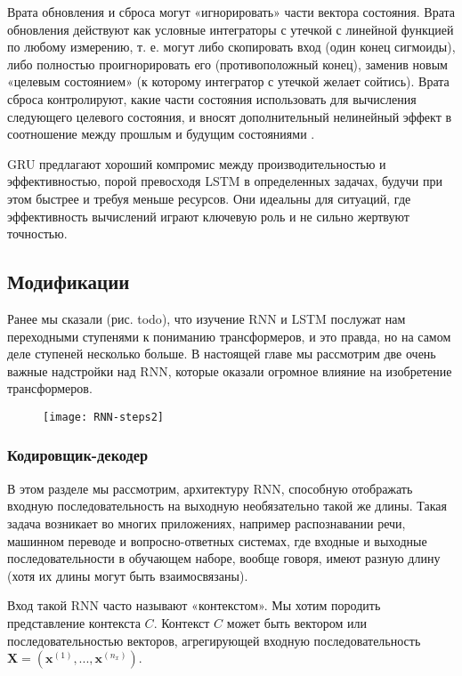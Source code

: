 Врата обновления и сброса могут «игнорировать» части вектора состояния. 
Врата обновления действуют как условные интеграторы с утечкой с линейной
функцией по любому измерению, т. е. могут либо скопировать вход (один конец 
сигмоиды), либо полностью проигнорировать его (противоположный конец), заменив
новым «целевым состоянием» (к которому интегратор с утечкой желает сойтись).
Врата сброса контролируют, какие части состояния использовать для вычисления 
следующего целевого состояния, и вносят дополнительный нелинейный эффект в 
соотношение между прошлым и будущим состояниями \cite{Goodfellow-et-al-2016}.

GRU предлагают хороший компромис между производительностью и эффективностью, 
порой превосходя LSTM в определенных задачах, будучи при этом быстрее и 
требуя меньше ресурсов. Они идеальны для ситуаций, где эффективность 
вычислений играют ключевую роль и не сильно жертвуют точностью.

\subsection{Модификации}

Ранее мы сказали (рис. {\color{red} todo}), что изучение RNN и LSTM послужат нам 
переходными ступенями к пониманию трансформеров, и это правда, но на самом деле 
ступеней несколько больше. В настоящей главе мы рассмотрим две очень важные надстройки 
над RNN, которые оказали огромное влияние на изобретение трансформеров.

\begin{figure}[h!]
    \centering
    \texttt{[image: RNN-steps2]}
    \caption{\cite{statquest_ml_series}}
    \label{fig:RNN-steps2}
\end{figure}

\subsubsection{Кодировщик-декодер}

В этом разделе мы рассмотрим, архитектуру RNN, способную отображать входную 
последовательность на выходную необязательно такой же длины. 
Такая задача возникает во многих
приложениях, например распознавании речи, машинном переводе и 
вопросно-ответных системах, где входные и выходные последовательности в 
обучающем наборе, вообще говоря, имеют разную длину 
(хотя их длины могут быть взаимосвязаны).

Вход такой RNN часто называют «контекстом». Мы хотим породить представление 
контекста $C$. Контекст $C$ может быть вектором или последовательностью векторов, 
агрегирующей входную последовательность $\bm{X} = (\bm{x}^{(1)}, ..., \bm{x}^{(n_x)})$.

